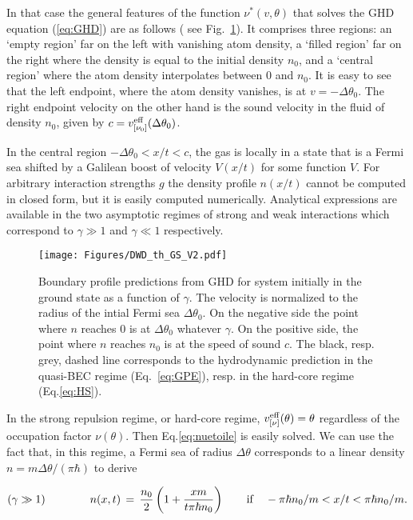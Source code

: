 In that case the general features of the function $\nu^*(v,\theta)$ that solves the GHD equation (\ref{eq:GHD})  are as follows ( see Fig.~\ref{fig:boundary_profiles_theory}). It comprises three regions: an `empty region' far on the left with vanishing atom density, a `filled  region' far on the right where the density is equal to the initial density $n_0$, and a `central region' where the atom density interpolates between $0$ and $n_0$. It is easy to see that the left endpoint, where the atom density vanishes, is at $v= -\Delta\theta_0$. 
The right endpoint velocity on the other hand is the sound velocity in the fluid of density $n_0$, given by $c =v^{\rm eff}_{[\nu_0]} (\Delta \theta_0)$. %

In the central region $ - \Delta \theta_0 < x/t < c$, the gas is locally in a state that is a Fermi sea shifted by a Galilean boost of velocity $V(x/t)$ for some function $V$. For arbitrary interaction strengths $g$ %
the density profile $n(x/t)$ cannot be computed in closed form, but it is easily computed numerically. Analytical expressions are available in the two asymptotic regimes of strong and weak interactions which correspond to $\gamma\gg 1$ and $\gamma\ll1$ respectively.




\begin{figure}[thb]
    \centering
    \texttt{[image: Figures/DWD\_th\_GS\_V2.pdf]}
    \caption{
    Boundary profile predictions from GHD for system initially in the ground state as a function of $\gamma$. The velocity  is normalized to the radius of the intial Fermi sea $\Delta \theta_0$. 
    On the negative side the 
    point where $n$ reaches 0 is at $\Delta \theta_0$ whatever $\gamma$.
    On the positive side, the point where $n$ reaches $n_0$ is at 
    the speed of sound $c$.
    The black, resp. grey, dashed line corresponds to the hydrodynamic prediction in the
    quasi-BEC regime (Eq.~\eqref{eq:GPE}), resp. in the  hard-core regime  (Eq.\eqref{eq:HS}).}
    \label{fig:boundary_profiles_theory}
\end{figure}


In the strong repulsion regime, or hard-core regime, 
$v^{\rm eff}_{[\nu]} (\theta)=\theta$ regardless of the occupation factor $\nu(\theta)$. Then 
Eq.\eqref{eq:nuetoile} is easily solved. 
We can use the fact that, in this regime, a Fermi sea of radius $\Delta\theta$ corresponds to a linear density $n=m\Delta\theta/(\pi\hbar)$ to derive

\begin{equation}
    (\gamma \gg 1) \qquad \qquad  n(x,t) \, = \, 
    \frac{n_0}{2}  \left( 1 +  \frac{xm}{t\pi\hbar n_0} \right)   \qquad {\rm if} \quad   -\pi\hbar n_0/m < x/t  < \pi\hbar n_0/m.
    \label{eq:HS}
\end{equation}

